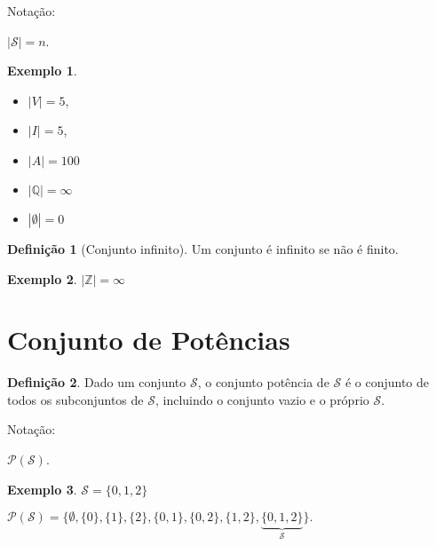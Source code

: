 \documentclass[]{book}
\theoremstyle{definition}
\newtheorem{definition}{Definição}[chapter]
\theoremstyle{definition}
\newtheorem{example}{Exemplo}[chapter]
\theoremstyle{definition}
\theoremstyle{remark}
\begin{document}
Notação:

\(|\mathcal{S}| = n\).

\begin{example}
\protect\hypertarget{exm:unnamed-chunk-8}{}{\label{exm:unnamed-chunk-8} }

\begin{itemize}
\item
  \(|V| = 5\),
\item
  \(|I| = 5\),
\item
  \(|A| = 100\)
\item
  \(|\mathbb{Q}| = \infty\)
\item
  \(|\emptyset| = 0\)
\end{itemize}
\end{example}

\begin{definition}[Conjunto infinito]
\protect\hypertarget{def:definfty}{}{\label{def:definfty} \iffalse (Conjunto infinito) \fi{} }Um conjunto é infinito se não é finito.
\end{definition}

\begin{example}
\protect\hypertarget{exm:unnamed-chunk-9}{}{\label{exm:unnamed-chunk-9} }
\(|\mathbb{Z}| = \infty\)
\end{example}

\hypertarget{conjunto-de-potuxeancias}{%
\section{Conjunto de Potências}\label{conjunto-de-potuxeancias}}

\begin{definition}
\protect\hypertarget{def:defconjpot}{}{\label{def:defconjpot} }Dado um conjunto \(\mathcal{S}\), o conjunto potência de \(\mathcal{S}\) é o conjunto de todos os subconjuntos de \(\mathcal{S}\), incluindo o conjunto vazio e o próprio \(\mathcal{S}\).
\end{definition}

Notação:

\(\mathcal{P}(\mathcal{S})\).

\begin{example}
\protect\hypertarget{exm:unnamed-chunk-10}{}{\label{exm:unnamed-chunk-10} }
\(\mathcal{S} = \{0,1,2\}\)

\(\mathcal{P}(\mathcal{S}) = \{\emptyset, \{0\}, \{1\}, \{2\}, \{0,1\}, \{0,2\}, \{1,2\}, \underbrace{\{0,1,2\}}_{\mathcal{S}} \}.\)
\end{example}
\end{document}

